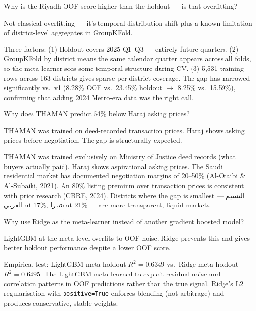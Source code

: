\documentclass[11pt, a4paper, twoside]{article}
\begin{document}
\begin{question}{Why is the Riyadh OOF score higher than the holdout --- is that overfitting?}
\begin{shortanswer}
Not classical overfitting --- it's temporal distribution shift plus a known
limitation of district-level aggregates in GroupKFold.
\end{shortanswer}

\begin{detail}
Three factors: (1) Holdout covers 2025 Q1--Q3 --- entirely future quarters.
(2) GroupKFold by district means the same calendar quarter appears across all
folds, so the meta-learner sees some temporal structure during CV. (3) 5,531
training rows across 163 districts gives sparse per-district coverage. The
gap has narrowed significantly vs.\ v1 (8.28\% OOF vs.\ 23.45\% holdout $\to$
8.25\% vs.\ 15.59\%), confirming that adding 2024 Metro-era data was the right
call.
\end{detail}
\end{question}

\bigskip

\begin{question}{Why does THAMAN predict 54\% below Haraj asking prices?}
\begin{shortanswer}
THAMAN was trained on deed-recorded transaction prices. Haraj shows asking
prices before negotiation. The gap is structurally expected.
\end{shortanswer}

\begin{detail}
THAMAN was trained exclusively on Ministry of Justice deed records (what buyers
actually paid). Haraj shows aspirational asking prices. The Saudi residential
market has documented negotiation margins of 20--50\% (Al-Otaibi \&
Al-Subaihi, 2021). An 80\% listing premium over transaction prices is
consistent with prior research (CBRE, 2024). Districts where the gap is
smallest --- \textarabic{النسيم الغربي} at 17\%, \textarabic{شبرا} at 21\% ---
are more transparent, liquid markets.
\end{detail}
\end{question}

\bigskip

\begin{question}{Why use Ridge as the meta-learner instead of another gradient
                  boosted model?}
\begin{shortanswer}
LightGBM at the meta level overfits to OOF noise. Ridge prevents this and
gives better holdout performance despite a lower OOF score.
\end{shortanswer}

\begin{detail}
Empirical test: LightGBM meta holdout $R^2=0.6349$ vs.\ Ridge meta holdout
$R^2=0.6495$. The LightGBM meta learned to exploit residual noise and
correlation patterns in OOF predictions rather than the true signal. Ridge's
L2 regularisation with \texttt{positive=True} enforces blending (not
arbitrage) and produces conservative, stable weights.
\end{detail}
\end{question}
\end{document}
